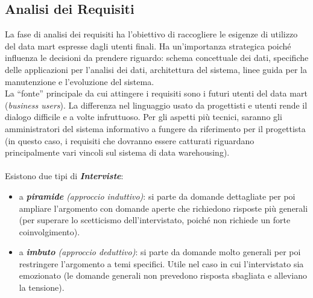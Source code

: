 \documentclass[a4paper, notitlepage, 9pt]{extreport}
\begin{document}
\subsection*{Analisi dei Requisiti}
La fase di analisi dei requisiti ha l’obiettivo di raccogliere le esigenze di utilizzo del data mart espresse dagli utenti finali. Ha un’importanza strategica poiché influenza le decisioni da prendere riguardo: schema concettuale dei dati, specifiche delle applicazioni per l’analisi dei dati, architettura del sistema, linee guida per la manutenzione e l’evoluzione del sistema.\\
La “fonte” principale da cui attingere i requisiti sono i futuri utenti del data mart (\textit{business users}). La differenza nel linguaggio usato da progettisti e utenti rende il dialogo difficile e a volte infruttuoso. Per gli aspetti più tecnici, saranno gli amministratori del sistema informativo a fungere da riferimento per il progettista (in questo caso, i requisiti che dovranno essere catturati riguardano principalmente vari vincoli sul sistema di data warehousing).\\\\
Esistono due tipi di \textit{\textbf{Interviste}}:
\begin{itemize}
	\item a \textit{\textbf{piramide} (approccio induttivo)}: si parte da domande dettagliate per poi ampliare l’argomento con domande aperte che richiedono risposte più generali (per superare lo scetticismo dell'intervistato, poiché non richiede un forte coinvolgimento).
	\item a \textit{\textbf{imbuto} (approccio deduttivo)}: si parte da domande molto generali per poi restringere l’argomento a temi specifici. Utile nel caso in cui l’intervistato sia emozionato (le domande generali non prevedono risposta sbagliata e alleviano la tensione).
\end{itemize}
\end{document}
